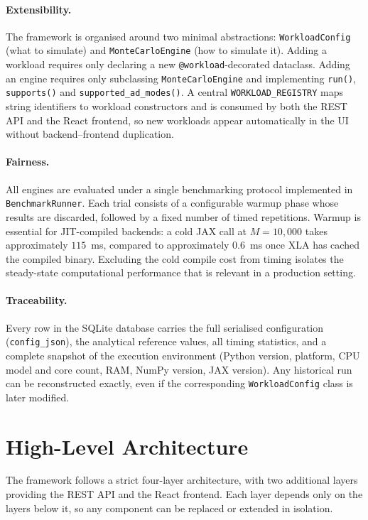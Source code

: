 \paragraph{Extensibility.}
The framework is organised around two minimal abstractions:
\texttt{WorkloadConfig} (what to simulate) and \texttt{MonteCarloEngine}
(how to simulate it). Adding a workload requires only declaring a new
\texttt{@workload}-decorated dataclass. Adding an engine requires only subclassing
\texttt{MonteCarloEngine} and implementing \texttt{run()}, \texttt{supports()} and
\texttt{supported\_ad\_modes()}. A central \texttt{WORKLOAD\_REGISTRY} maps string
identifiers to workload constructors and is consumed by both the REST API and the
React frontend, so new workloads appear automatically in the UI without
backend--frontend duplication.

\paragraph{Fairness.}
All engines are evaluated under a single benchmarking protocol implemented in
\texttt{BenchmarkRunner}. Each trial consists of a configurable warmup phase whose
results are discarded, followed by a fixed number of timed repetitions. Warmup is
essential for JIT-compiled backends: a cold JAX call at $M=10{,}000$ takes
approximately $115$~ms, compared to approximately $0.6$~ms once XLA has cached the
compiled binary. Excluding the cold compile cost from timing isolates the
steady-state computational performance that is relevant in a production setting.

\paragraph{Traceability.}
Every row in the SQLite database carries the full serialised configuration
(\texttt{config\_json}), the analytical reference values, all timing statistics,
and a complete snapshot of the execution environment (Python version, platform,
CPU model and core count, RAM, NumPy version, JAX version). Any historical run
can be reconstructed exactly, even if the corresponding \texttt{WorkloadConfig}
class is later modified.

\section{High-Level Architecture}
\label{sec:architecture}

The framework follows a strict four-layer architecture, with two additional layers
providing the REST API and the React frontend. Each layer depends only on the
layers below it, so any component can be replaced or extended in isolation.

